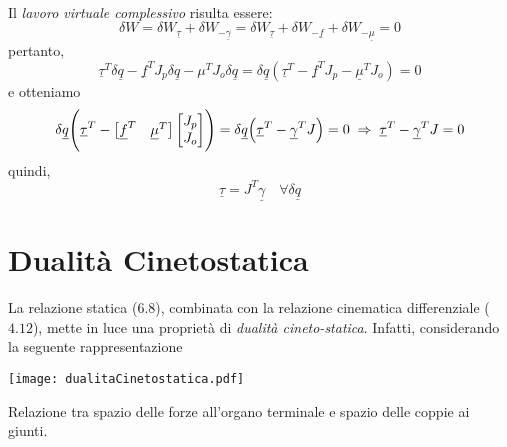 \paragraph{}
Il \emph{lavoro virtuale complessivo} risulta essere:
\begin{equation}
	\delta W = \delta W_{\underline{\tau}} + \delta W_{- \underline{\gamma}} = \delta W_{\underline{\tau}} + \delta W_{- \underline{f}} + \delta W_{- \underline{\mu}} = 0
\end{equation}
pertanto, 
\begin{equation}
	\underline{\tau}^T \delta \underline{q} - \underline{f}^T J_p \delta \underline{q} - \mu^T J_o \delta \underline{q} = \delta \underline{q} ( \underline{\tau}^T - \underline{f}^T J_p - \underline{\mu}^T J_o) = 0
\end{equation}
e otteniamo
\begin{equation}
	\delta \underline{q} \Biggl( \underline{\tau}^T - 
	\begin{bmatrix}
		\underline{f}^T & \underline{\mu}^T
	\end{bmatrix}
	\begin{bmatrix}
		J_p \\
		J_o \\
	\end{bmatrix}
    \Biggr) = \delta \underline{q} \Bigl( \underline{\tau}^T - \underline{\gamma}^TJ \Bigr) = 0 \; \Rightarrow \; \underline{\tau}^T - \underline{\gamma}^T J = 0
\end{equation}
quindi,
\begin{equation}
	\underline{\tau} = J^T \underline{\gamma} \quad \forall \delta \underline{q}
\end{equation}

\section{Dualità Cinetostatica}
La relazione statica ($6.8$), combinata con la relazione cinematica differenziale ($4.12$), mette in luce una proprietà di \emph{dualità cineto-statica}. Infatti, considerando la seguente rappresentazione 

\begin{center}
	\texttt{[image: dualitaCinetostatica.pdf]}
	\caption{Relazione tra spazio delle forze all'organo terminale e spazio delle coppie ai giunti.}
\end{center}

